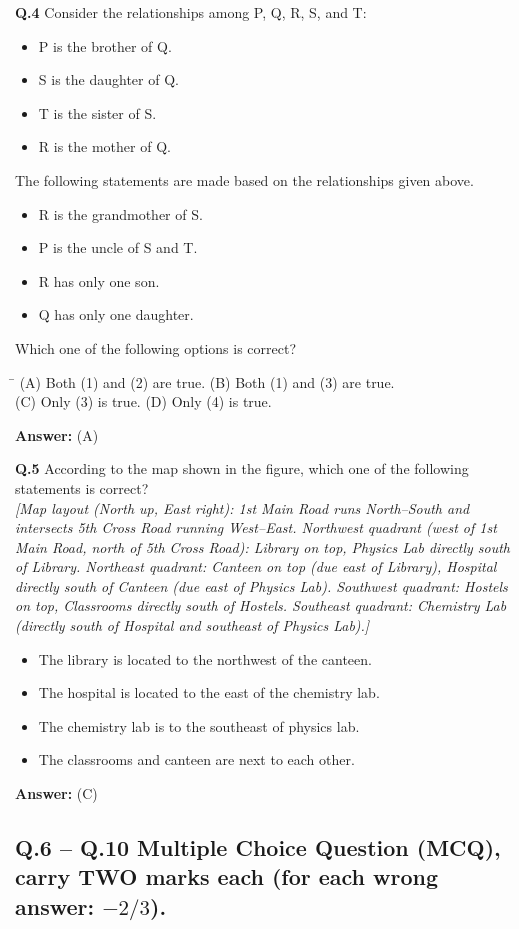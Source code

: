 \documentclass[11pt,a4paper]{article}
\newcommand{\optsfourA}[4]{%
  \begin{tabbing}
    \hspace{0.48\linewidth}\=\kill
    (A) #1 \> (B) #2 \\[2pt]
    (C) #3 \> (D) #4
  \end{tabbing}%
}
\newcommand{\optslistA}[4]{%
  \begin{itemize}
    \setlength{\itemsep}{2pt}\setlength{\parskip}{0pt}
    \item[(A)] #1
    \item[(B)] #2
    \item[(C)] #3
    \item[(D)] #4
  \end{itemize}%
}
\newcommand{\ans}[1]{\textbf{Answer:} #1\par\medskip}
\begin{document}
\textbf{Q.4} Consider the relationships among P, Q, R, S, and T:
\begin{itemize}
  \setlength{\itemsep}{1pt}\setlength{\parskip}{0pt}
  \item P is the brother of Q.
  \item S is the daughter of Q.
  \item T is the sister of S.
  \item R is the mother of Q.
\end{itemize}
The following statements are made based on the relationships given above.
\begin{itemize}
  \setlength{\itemsep}{1pt}\setlength{\parskip}{0pt}
  \item[(1)] R is the grandmother of S.
  \item[(2)] P is the uncle of S and T.
  \item[(3)] R has only one son.
  \item[(4)] Q has only one daughter.
\end{itemize}
Which one of the following options is correct?
\optsfourA{Both (1) and (2) are true.}{Both (1) and (3) are true.}{Only (3) is true.}{Only (4) is true.}
\ans{(A)}

\textbf{Q.5} According to the map shown in the figure, which one of the following statements is correct?\\
\emph{[Map layout (North up, East right): 1st Main Road runs North--South and intersects 5th Cross Road running West--East. Northwest quadrant (west of 1st Main Road, north of 5th Cross Road): Library on top, Physics Lab directly south of Library. Northeast quadrant: Canteen on top (due east of Library), Hospital directly south of Canteen (due east of Physics Lab). Southwest quadrant: Hostels on top, Classrooms directly south of Hostels. Southeast quadrant: Chemistry Lab (directly south of Hospital and southeast of Physics Lab).]}
\optslistA{The library is located to the northwest of the canteen.}{The hospital is located to the east of the chemistry lab.}{The chemistry lab is to the southeast of physics lab.}{The classrooms and canteen are next to each other.}
\ans{(C)}

\subsection*{Q.6 -- Q.10 Multiple Choice Question (MCQ), carry TWO marks each (for each wrong answer: $-2/3$).}
\end{document}
